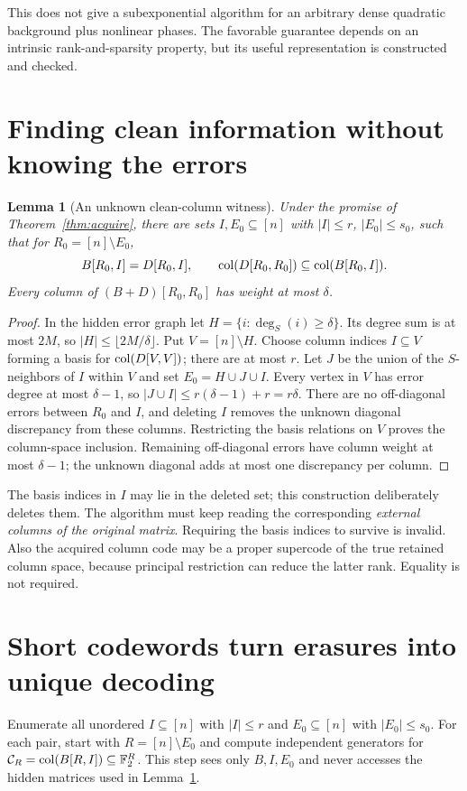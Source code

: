 \documentclass[11pt,a4paper]{article}
\newtheorem{lemma}[theorem]{Lemma}
\theoremstyle{remark}\newtheorem{remark}[theorem]{Remark}
\newcommand{\F}{\mathbb F}\newcommand{\Z}{\mathbb Z}\newcommand{\Q}{\mathbb Q}
\begin{document}
This does not give a subexponential algorithm for an arbitrary dense
quadratic background plus nonlinear phases. The favorable guarantee
depends on an intrinsic rank-and-sparsity property, but its useful
representation is constructed and checked.

\section{Finding clean information without knowing the errors}
\label{sec:clean}
\begin{lemma}[An unknown clean-column witness]\label{lem:clean}
Under the promise of Theorem~\ref{thm:acquire}, there are sets
$I,E_0\subseteq[n]$ with $|I|\le r$, $|E_0|\le s_0$, such that
for $R_0=[n]\setminus E_0$,
\[
B[R_0,I]=D[R_0,I],\qquad
\operatorname{col}(D[R_0,R_0])\subseteq\operatorname{col}(B[R_0,I]).
\]
Every column of $(B+D)[R_0,R_0]$ has weight at most $\delta$.
\end{lemma}
\begin{proof}
In the hidden error graph let $H=\{i:\deg_S(i)\ge\delta\}$.
Its degree sum is at most $2M$, so
$|H|\le\lfloor2M/\delta\rfloor$. Put $V=[n]\setminus H$.
Choose column indices $I\subseteq V$ forming a basis for
$\operatorname{col}(D[V,V])$; there are at most $r$.
Let $J$ be the union of the $S$-neighbors of $I$ within $V$ and
set $E_0=H\cup J\cup I$. Every vertex in $V$ has error degree
at most $\delta-1$, so $|J\cup I|\le r(\delta-1)+r=r\delta$.
There are no off-diagonal errors between $R_0$ and $I$, and
deleting $I$ removes the unknown diagonal discrepancy from these
columns. Restricting the basis relations on $V$ proves the
column-space inclusion. Remaining off-diagonal errors have
column weight at most $\delta-1$; the unknown diagonal adds
at most one discrepancy per column.
\end{proof}

The basis indices in $I$ may lie in the deleted set; this
construction deliberately deletes them. The algorithm must keep
reading the corresponding \emph{external columns of the original
matrix}. Requiring the basis indices to survive is invalid.
Also the acquired column code may be a proper supercode of the
true retained column space, because principal restriction can
reduce the latter rank. Equality is not required.

\section{Short codewords turn erasures into unique decoding}
\label{sec:prune}
Enumerate all unordered $I\subseteq[n]$ with $|I|\le r$ and
$E_0\subseteq[n]$ with $|E_0|\le s_0$. For each pair, start with
$R=[n]\setminus E_0$ and compute independent generators for
$\mathcal C_R=\col(B[R,I])\subseteq\F_2^R$.
This step sees only $B,I,E_0$ and never accesses the hidden
matrices used in Lemma~\ref{lem:clean}.
\end{document}
